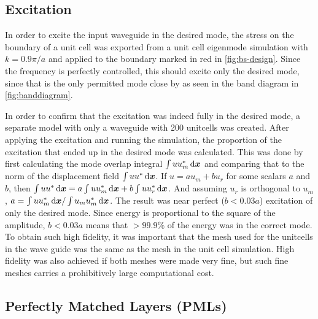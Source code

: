 \subsection{Excitation}\label{sec:excitation_method}

In order to excite the input waveguide in the desired mode,
the stress on the boundary of a unit cell was exported from a unit cell
eigenmode simulation with $k=0.9 \pi / a$ and applied to the boundary marked in red in
\cref{fig:bs-design}.
Since the frequency is perfectly controlled, this should excite only the desired
mode, since that is the only permitted mode close by as seen in the band diagram
in \cref{fig:banddiagram}.

In order to confirm that the excitation was indeed fully in the desired mode, a
separate model with only a waveguide with 200 unitcells was created.
After applying the excitation and running the simulation,
the proportion of the excitation that ended up in the desired mode was
calculated.
This was done by first calculating the mode overlap integral
$\int u u_m^* \dl{\vec x}$
and comparing that to the norm of the displacement field
$\int u u^* \dl{\vec x}$.
If $u = a u_m + b u_r$ for some scalars $a$ and $b$, then
$\int u u^* \dl{\vec x} = a\int u u_m^*\dl{\vec x} + b\int u u_r^*\dl{\vec x}$.
And assuming $u_r$ is orthogonal to $u_m$,
$a = \int u u_m^*\dl{\vec x} / \int u_m u_m^*\dl{\vec x}$.
The result was near perfect ($b < 0.03 a$) excitation of only the desired mode.
Since energy is proportional to
the square of the amplitude, $b < 0.03 a$ means that $>99.9 \%$ of the energy was
in the correct mode.
To obtain such high fidelity, it was important that the mesh used for the
unitcells in the wave guide was the same as the mesh in the unit cell
simulation.
High fidelity was also achieved if both meshes were made very fine, but such
fine meshes carries a prohibitively large computational cost.

\subsection{Perfectly Matched Layers (PMLs)}

